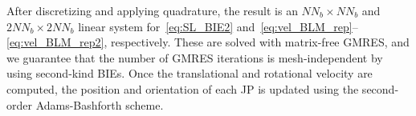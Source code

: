 \documentclass[prb,preprint,showpacs,preprintnumbers,amsmath,amssymb,longbibliography]{revtex4-1}
\renewcommand{\aa}{\mathbf{a}}
\renewcommand{\vv}{\mathbf{v}}
\begin{document}
After discretizing and applying quadrature, the result is an $NN_b
\times NN_b$ and $2NN_b \times 2NN_b$ linear system
for~\eqref{eq:SL_BIE2}
and~\eqref{eq:vel_BLM_rep}--\eqref{eq:vel_BLM_rep2}, respectively.
These are solved with matrix-free GMRES, and we guarantee that the
number of GMRES iterations is mesh-independent by using second-kind
BIEs. Once the translational and rotational velocity are computed, the
position and orientation of each JP is updated using the second-order
Adams-Bashforth scheme.

\end{document}
